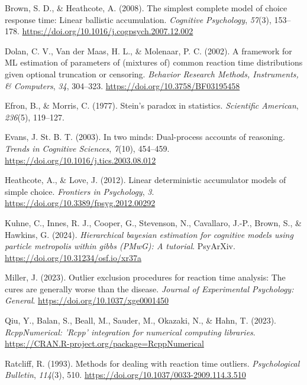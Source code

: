 \documentclass[
  man,
  floatsintext,
  longtable,
  nolmodern,
  notxfonts,
  notimes,
  colorlinks=true,linkcolor=blue,citecolor=blue,urlcolor=blue]{apa7}
\newlength{\cslhangindent}
\newenvironment{CSLReferences}[2] %
 {\begin{list}{}{%
  \setlength{\itemindent}{0pt}
  \setlength{\leftmargin}{0pt}
  \setlength{\parsep}{0pt}
  \ifodd #1
   \setlength{\leftmargin}{\cslhangindent}
   \setlength{\itemindent}{-1\cslhangindent}
  \fi
  \setlength{\itemsep}{#2\baselineskip}}}
 {\end{list}}
\begin{document}
\label{refs}
\begin{CSLReferences}{1}{0}
Brown, S. D., \& Heathcote, A. (2008). The simplest complete model of
choice response time: Linear ballistic accumulation. \emph{Cognitive
Psychology}, \emph{57}(3), 153--178.
\url{https://doi.org/10.1016/j.cogpsych.2007.12.002}

Dolan, C. V., Van der Maas, H. L., \& Molenaar, P. C. (2002). A
framework for ML estimation of parameters of (mixtures of) common
reaction time distributions given optional truncation or censoring.
\emph{Behavior Research Methods, Instruments, \& Computers}, \emph{34},
304--323. \url{https://doi.org/10.3758/BF03195458}

Efron, B., \& Morris, C. (1977). Stein's paradox in statistics.
\emph{Scientific American}, \emph{236}(5), 119--127.

Evans, J. St. B. T. (2003). In two minds: Dual-process accounts of
reasoning. \emph{Trends in Cognitive Sciences}, \emph{7}(10), 454--459.
\url{https://doi.org/10.1016/j.tics.2003.08.012}

Heathcote, A., \& Love, J. (2012). Linear deterministic accumulator
models of simple choice. \emph{Frontiers in Psychology}, \emph{3}.
\url{https://doi.org/10.3389/fpsyg.2012.00292}

Kuhne, C., Innes, R. J., Cooper, G., Stevenson, N., Cavallaro, J.-P.,
Brown, S., \& Hawkins, G. (2024). \emph{Hierarchical bayesian estimation
for cognitive models using particle metropolis within gibbs (PMwG): A
tutorial}. PsyArXiv. \url{https://doi.org/10.31234/osf.io/xr37a}

Miller, J. (2023). Outlier exclusion procedures for reaction time
analysis: The cures are generally worse than the disease. \emph{Journal
of Experimental Psychology: General}.
\url{https://doi.org/10.1037/xge0001450}

Qiu, Y., Balan, S., Beall, M., Sauder, M., Okazaki, N., \& Hahn, T.
(2023). \emph{RcppNumerical: 'Rcpp' integration for numerical computing
libraries}. \url{https://CRAN.R-project.org/package=RcppNumerical}

Ratcliff, R. (1993). Methods for dealing with reaction time outliers.
\emph{Psychological Bulletin}, \emph{114}(3), 510.
\url{https://doi.org/10.1037/0033-2909.114.3.510}


\end{CSLReferences}
\end{document}
